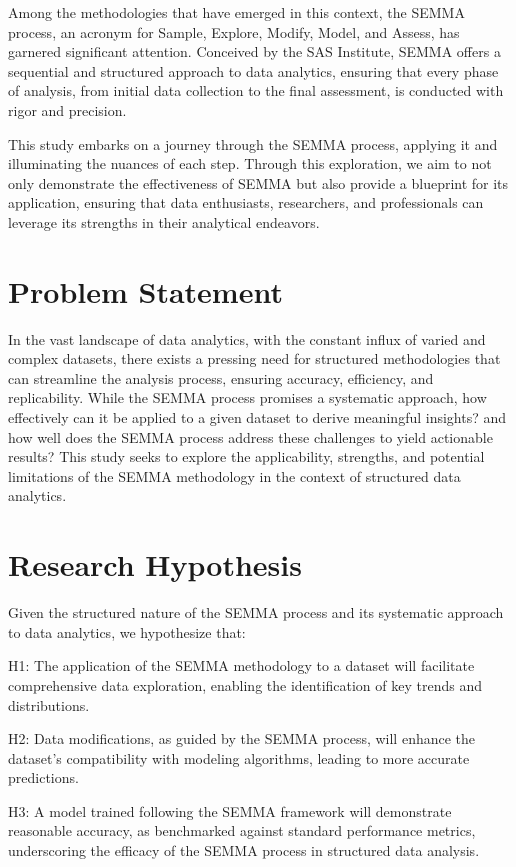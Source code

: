\documentclass{article}
\begin{document}
Among the methodologies that have emerged in this context, the SEMMA process, an acronym for Sample, Explore, Modify, Model, and Assess, has garnered significant attention. Conceived by the SAS Institute, SEMMA offers a sequential and structured approach to data analytics, ensuring that every phase of analysis, from initial data collection to the final assessment, is conducted with rigor and precision.

This study embarks on a journey through the SEMMA process, applying it and illuminating the nuances of each step. Through this exploration, we aim to not only demonstrate the effectiveness of SEMMA but also provide a blueprint for its application, ensuring that data enthusiasts, researchers, and professionals can leverage its strengths in their analytical endeavors.



\section{Problem Statement }
In the vast landscape of data analytics, with the constant influx of varied and complex datasets, there exists a pressing need for structured methodologies that can streamline the analysis process, ensuring accuracy, efficiency, and replicability. While the SEMMA process promises a systematic approach, how effectively can it be applied to a given dataset to derive meaningful insights? and how well does the SEMMA process address these challenges to yield actionable results? This study seeks to explore the applicability, strengths, and potential limitations of the SEMMA methodology in the context of structured data analytics.



\section{Research Hypothesis}
Given the structured nature of the SEMMA process and its systematic approach to data analytics, we hypothesize that:

H1: The application of the SEMMA methodology to a dataset will facilitate comprehensive data exploration, enabling the identification of key trends and distributions.

H2: Data modifications, as guided by the SEMMA process, will enhance the dataset's compatibility with modeling algorithms, leading to more accurate predictions.

H3: A model trained following the SEMMA framework will demonstrate reasonable accuracy, as benchmarked against standard performance metrics, underscoring the efficacy of the SEMMA process in structured data analysis.
\end{document}
